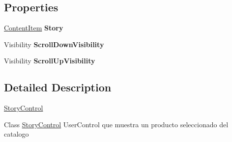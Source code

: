 \subsection*{Properties}
\begin{DoxyCompactItemize}
\item 
\hypertarget{class_microsoft_1_1_samples_1_1_kinect_1_1_basic_interactions_1_1_story_control_a0bb5e7abc4a891645d6d55ef6265ad69}{\hyperlink{class_microsoft_1_1_samples_1_1_kinect_1_1_basic_interactions_1_1_content_item}{Content\-Item} {\bfseries Story}}\label{class_microsoft_1_1_samples_1_1_kinect_1_1_basic_interactions_1_1_story_control_a0bb5e7abc4a891645d6d55ef6265ad69}

\item 
\hypertarget{class_microsoft_1_1_samples_1_1_kinect_1_1_basic_interactions_1_1_story_control_a1e1f893be993765d02cafcf0d830484d}{Visibility {\bfseries Scroll\-Down\-Visibility}}\label{class_microsoft_1_1_samples_1_1_kinect_1_1_basic_interactions_1_1_story_control_a1e1f893be993765d02cafcf0d830484d}

\item 
\hypertarget{class_microsoft_1_1_samples_1_1_kinect_1_1_basic_interactions_1_1_story_control_a5e98b7c8174dc3c46c9f287663ccfed2}{Visibility {\bfseries Scroll\-Up\-Visibility}}\label{class_microsoft_1_1_samples_1_1_kinect_1_1_basic_interactions_1_1_story_control_a5e98b7c8174dc3c46c9f287663ccfed2}

\end{DoxyCompactItemize}


\subsection{Detailed Description}
\hyperlink{class_microsoft_1_1_samples_1_1_kinect_1_1_basic_interactions_1_1_story_control}{Story\-Control} 

Class \hyperlink{class_microsoft_1_1_samples_1_1_kinect_1_1_basic_interactions_1_1_story_control}{Story\-Control} User\-Control que muestra un producto seleccionado del catalogo 

